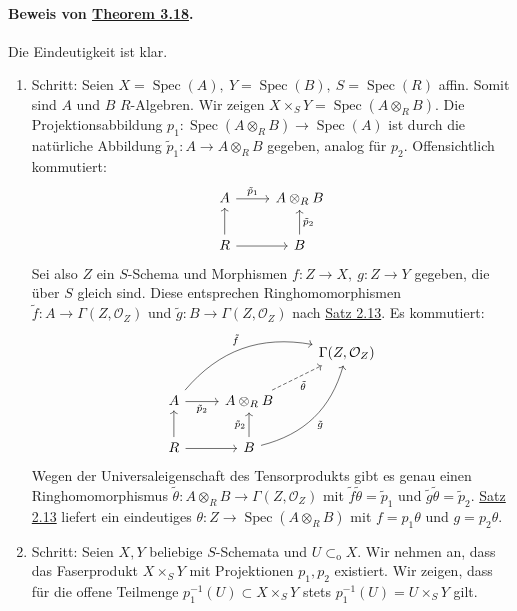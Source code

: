 \documentclass[11pt,b5paper,openany]{memoir}
\begin{document}
\paragraph{Beweis von \hyperref[3.18]{Theorem 3.18}.} Die Eindeutigkeit ist klar.
\begin{enumerate}
\item Schritt: Seien $X=\operatorname{Spec}(A),\ Y=\operatorname{Spec}(B),\ S=\operatorname{Spec}(R)$ affin. Somit sind $A$ und $B$ $R$-Algebren. Wir zeigen $X\times_S Y=\operatorname{Spec}(A\otimes_R B)$. Die Projektionsabbildung $p_1:\operatorname{Spec}(A\otimes_RB)\to \operatorname{Spec}(A)$ ist durch die natürliche Abbildung $\tilde{p}_1:A\to A\otimes_RB$ gegeben, analog für $p_2$. Offensichtlich kommutiert:
\[\begin{tikzcd}
 A\ar[r, "\tilde{p}_1"] & A\otimes_RB\\
 R\ar[r]\ar[u] & B\ar[u, "\tilde{p}_2"']
\end{tikzcd} \]
Sei also $Z$ ein $S$-Schema und Morphismen $f:Z\to X,\ g:Z\to Y$ gegeben, die über $S$ gleich sind. Diese entsprechen Ringhomomorphismen $\tilde{f}:A\to\Gamma(Z,\mathcal{O}_Z)$ und $\tilde{g}:B\to\Gamma(Z,\mathcal{O}_Z)$ nach \hyperref[2.13]{Satz 2.13}. Es kommutiert:
\[\begin{tikzcd}
&&\Gamma(Z,\mathcal{O}_Z)\\
A\ar[r, "\tilde{p}_2"']\ar[rru, "\tilde{f}", bend left]& A\otimes_RB\ar[ru, "\tilde{\theta}"', dashed] &\\
R\ar[r]\ar[u] & B\ar[u, "\tilde{p}_2"]\ar[ruu, "\tilde{g}"', bend right]
\end{tikzcd} \]
Wegen der Universaleigenschaft des Tensorprodukts gibt es genau einen Ringhomomorphismus $\tilde{\theta}:A\otimes_RB\to\Gamma(Z,\mathcal{O}_Z)$ mit $\tilde{f}\tilde{\theta}=\tilde{p}_1$ und $\tilde{g}\tilde{\theta}=\tilde{p}_2$. \hyperref[2.13]{Satz 2.13} liefert ein eindeutiges $\theta:Z\to\operatorname{Spec}(A\otimes_RB)$ mit $f=p_1\theta$ und $g=p_2\theta$.
\item Schritt: Seien $X,Y$ beliebige $S$-Schemata und $U\subset_\text{o}X$. Wir nehmen an, dass das Faserprodukt $X\times_SY$ mit Projektionen $p_1,p_2$ existiert. Wir zeigen, dass für die offene Teilmenge $p_1^{-1}(U)\subset X\times_SY$ stets $p_1^{-1}(U)=U\times_SY$ gilt.


\end{enumerate}
\end{document}
